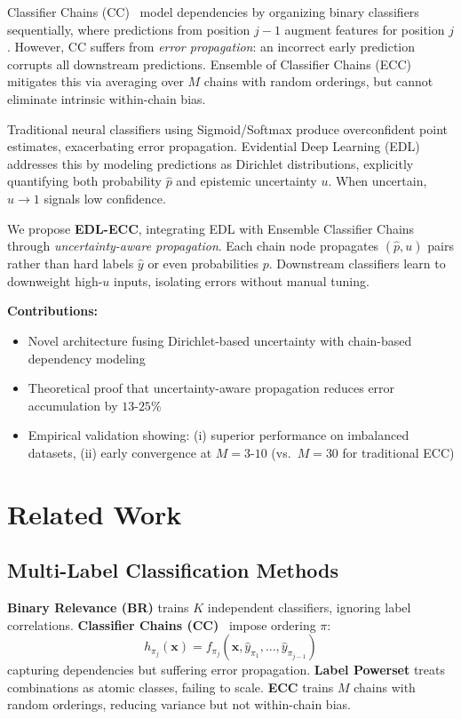 \documentclass[conference]{IEEEtran}
\begin{document}
Classifier Chains (CC)~\cite{read2011classifier} model dependencies by organizing binary classifiers sequentially, where predictions from position $j-1$ augment features for position $j$. However, CC suffers from \textit{error propagation}: an incorrect early prediction corrupts all downstream predictions. Ensemble of Classifier Chains (ECC) mitigates this via averaging over $M$ chains with random orderings, but cannot eliminate intrinsic within-chain bias.

Traditional neural classifiers using Sigmoid/Softmax produce overconfident point estimates, exacerbating error propagation. Evidential Deep Learning (EDL)~\cite{sensoy2018evidential} addresses this by modeling predictions as Dirichlet distributions, explicitly quantifying both probability $\hat{p}$ and epistemic uncertainty $u$. When uncertain, $u \to 1$ signals low confidence.

We propose \textbf{EDL-ECC}, integrating EDL with Ensemble Classifier Chains through \textit{uncertainty-aware propagation}. Each chain node propagates $(\hat{p}, u)$ pairs rather than hard labels $\hat{y}$ or even probabilities $p$. Downstream classifiers learn to downweight high-$u$ inputs, isolating errors without manual tuning.

\textbf{Contributions:}
\begin{itemize}
\item Novel architecture fusing Dirichlet-based uncertainty with chain-based dependency modeling
\item Theoretical proof that uncertainty-aware propagation reduces error accumulation by $13$-$25\%$
\item Empirical validation showing: (i) superior performance on imbalanced datasets, (ii) early convergence at $M=3$-$10$ (vs.~$M=30$ for traditional ECC)
\end{itemize}

\section{Related Work}

\subsection{Multi-Label Classification Methods}

\textbf{Binary Relevance (BR)} trains $K$ independent classifiers, ignoring label correlations. \textbf{Classifier Chains (CC)}~\cite{read2011classifier} impose ordering $\pi$:
\begin{equation}
h_{\pi_j}(\mathbf{x}) = f_{\pi_j}(\mathbf{x}, \hat{y}_{\pi_1}, \ldots, \hat{y}_{\pi_{j-1}})
\end{equation}
capturing dependencies but suffering error propagation. \textbf{Label Powerset} treats combinations as atomic classes, failing to scale. \textbf{ECC} trains $M$ chains with random orderings, reducing variance but not within-chain bias.
\end{document}

